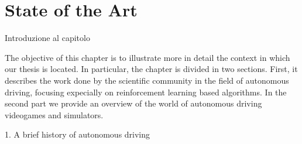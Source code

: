 \chapter{State of the Art}
\label{State of the Art}
\thispagestyle{empty}






Introduzione al capitolo


The objective of this chapter is to illustrate more in detail the context in which our thesis is located.
In particular, the chapter is divided in two sections. First, it describes the work done by the scientific community in the field of autonomous driving, focusing expecially on reinforcement learning based algorithms.
In the second part we provide an overview of the world of autonomous driving videogames and simulators.





1. A brief history of autonomous driving

